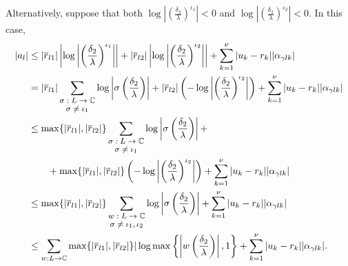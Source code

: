 Alternatively, suppose that both $\log\left|\left(\frac{\delta_2}{\lambda}\right)^{\iota_1}\right| < 0$ and $\log\left|\left(\frac{\delta_2}{\lambda}\right)^{\iota_2}\right| < 0$. In this case,
\begin{align*}
|a_l| 	& \leq |\overline{r}_{l1}|\left|\log\left|\left(\frac{\delta_2}{\lambda}\right)^{\iota_1}\right|\right| + |\overline{r}_{l2}|\left|\log\left|\left(\frac{\delta_2}{\lambda}\right)^{\iota_2}\right|\right| + \sum_{k=1}^{\nu}|u_k-r_k||\alpha_{\gamma l k}|\\
	& = |\overline{r}_{l1}|\sum_{\shortstack{\footnotesize $\sigma: L \to \mathbb{C} $\\ \footnotesize $ \sigma \neq \iota_1$}} \log\left|\sigma \left(\frac{\delta_2}{\lambda}\right)\right|+ |\overline{r}_{l2}|\left(-\log\left|\left(\frac{\delta_2}{\lambda}\right)^{\iota_2}\right|\right) + \sum_{k=1}^{\nu}|u_k-r_k||\alpha_{\gamma l k}|\\
	& \leq \max\{|\overline{r}_{l1}|, |\overline{r}_{l2}|\}\sum_{\shortstack{\footnotesize $\sigma: L \to \mathbb{C} $\\ \footnotesize $ \sigma \neq \iota_1$}} \log\left|\sigma \left(\frac{\delta_2}{\lambda}\right)\right| +\\
	& \quad \quad +\max\{|\overline{r}_{l1}|, |\overline{r}_{l2}|\}\left(-\log\left|\left(\frac{\delta_2}{\lambda}\right)^{\iota_2}\right|\right) + \sum_{k=1}^{\nu}|u_k-r_k||\alpha_{\gamma l k}|\\
	& \leq \max\{|\overline{r}_{l1}|, |\overline{r}_{l2}|\}\sum_{\shortstack{\footnotesize $w: L \to \mathbb{C} $\\ \footnotesize $ \sigma \neq \iota_1, \iota_2$}} \log\left|\sigma \left(\frac{\delta_2}{\lambda}\right)\right|  + \sum_{k=1}^{\nu}|u_k-r_k||\alpha_{\gamma l k}|\\
	&  \leq \sum_{w: L \to \mathbb{C}}\max\{|\overline{r}_{l1}|, |\overline{r}_{l2}|\}|\log\max\left\{\left|w\left(\frac{\delta_2}{\lambda}\right)\right|,1\right\} + \sum_{k=1}^{\nu}|u_k-r_k||\alpha_{\gamma l k}|.
\end{align*}

